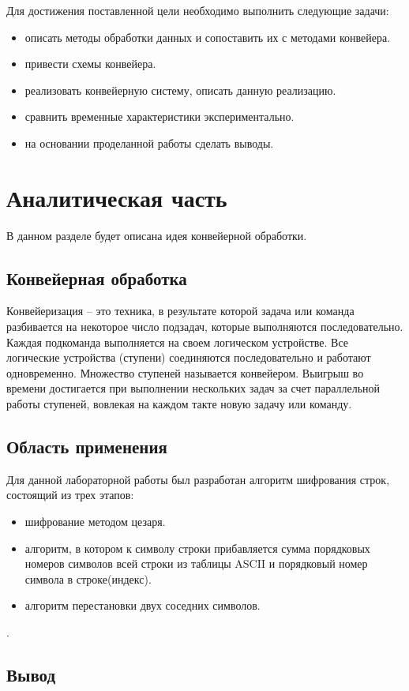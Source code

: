 Для достижения поставленной цели необходимо выполнить следующие задачи:
\begin{itemize}
    \item описать методы обработки данных и  сопоставить их с  методами конвейера.
    \item привести схемы конвейера.
    \item реализовать конвейерную систему, описать данную реализацию.
    \item сравнить  временные характеристики экспериментально.
    \item на основании проделанной работы сделать выводы.
\end{itemize}

\section{Аналитическая часть}






В данном разделе будет описана идея конвейерной обработки.

\subsection{Конвейерная обработка}
Конвейеризация – это техника, в результате которой задача или команда разбивается на некоторое число подзадач, которые выполняются
последовательно. Каждая подкоманда выполняется на своем логическом
устройстве. Все логические устройства (ступени) соединяются последовательно и работают одновременно. Множество ступеней называется
конвейером. Выигрыш во времени достигается при выполнении нескольких
задач за счет параллельной работы ступеней, вовлекая на каждом такте
новую задачу или команду.


\subsection{Область применения}
	Для данной лабораторной работы был разработан алгоритм шифрования строк, состоящий из трех этапов:
	
	\begin{itemize}
    \item шифрование методом цезаря.
    \item алгоритм, в котором к символу строки прибавляется сумма порядковых номеров символов всей строки из таблицы ASCII и порядковый номер  символа в строке(индекс).
    \item алгоритм перестановки двух соседних символов.
\end{itemize} . \subsection{Вывод}

